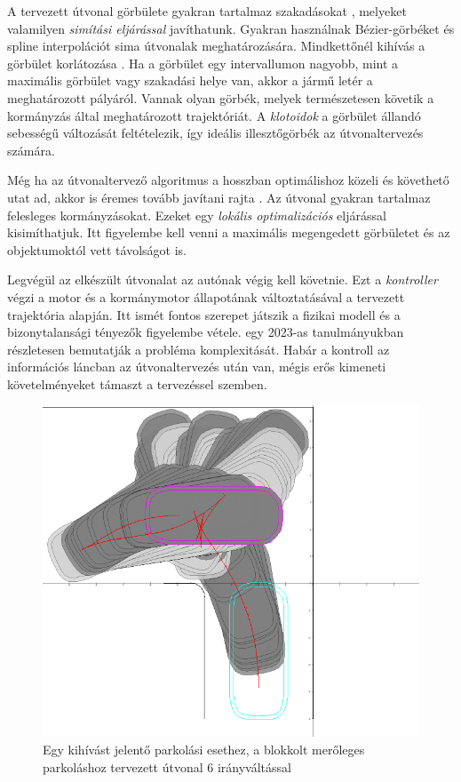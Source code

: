 \documentclass{article}
\begin{document}
A tervezett útvonal görbülete gyakran tartalmaz szakadásokat \cite{zhang2021jpsBézier}, melyeket valamilyen \textit{simítási eljárással} \cite{gonzalez2015review} javíthatunk. Gyakran használnak Bézier-görbéket \cite{zhang2021jpsBézier} és spline interpolációt \cite{berglund2009bSplinePaths} sima útvonalak meghatározására. Mindkettőnél kihívás a görbület korlátozása \cite{maekawa2010curvatureContBSpline, cimurs2017bezierSmoothingCurvature}. Ha a görbület egy intervallumon nagyobb, mint a maximális görbület vagy szakadási helye van, akkor a jármű letér a meghatározott pályáról. Vannak olyan görbék, melyek természetesen követik a kormányzás által meghatározott trajektóriát. A \textit{klotoidok} \cite{brezak2013clothoidApprox} a görbület állandó sebességű változását feltételezik, így ideális illesztőgörbék az útvonaltervezés számára.

Még ha az útvonaltervező algoritmus a hosszban optimálishoz közeli és követhető utat ad, akkor is éremes tovább javítani rajta \cite{dolgov2008hybridAstar}. Az útvonal gyakran tartalmaz felesleges kormányzásokat. Ezeket egy \textit{lokális optimalizációs} eljárással kisimíthatjuk. Itt figyelembe kell venni a maximális megengedett görbületet és az objektumoktól vett távolságot is.

Legvégül az elkészült útvonalat az autónak végig kell követnie. Ezt a \textit{kontroller} végzi a motor és a kormánymotor állapotának változtatásával a tervezett trajektória alapján. Itt ismét fontos szerepet játszik a fizikai modell és a bizonytalansági tényezők figyelembe vétele. \citeauthor{liu2023controlSurvey} egy 2023-as tanulmányukban \cite{liu2023controlSurvey} részletesen bemutatják a probléma komplexitását. Habár a kontroll az információs láncban az útvonaltervezés után van, mégis erős kimeneti követelményeket támaszt a tervezéssel szemben.

\begin{figure}
  \centering
  \includegraphics[width=0.75\linewidth]{images/scenes/cross-blocked.png}
  \caption[Egy kihívást jelentő parkolási eset]{Egy kihívást jelentő parkolási esethez, a blokkolt merőleges parkoláshoz tervezett útvonal $6$ irányváltással}
  \label{fig:opening-cross-blocked}
\end{figure}
\end{document}
